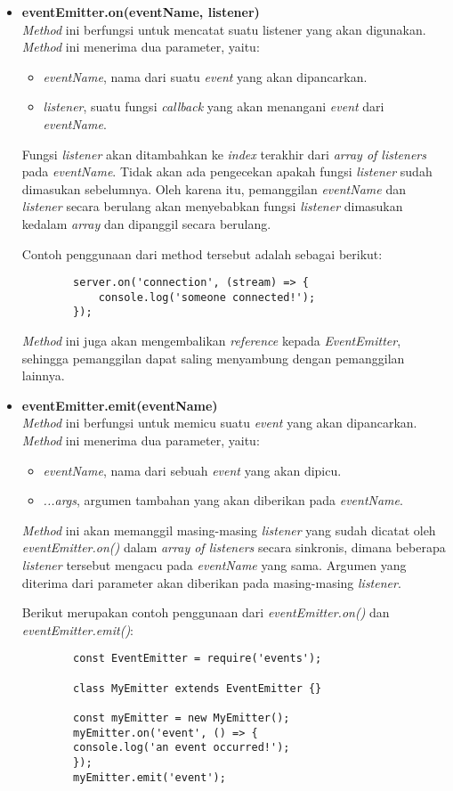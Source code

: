 \begin{itemize}
	\item \textbf{eventEmitter.on(eventName, listener)} \\ \textit{Method} ini berfungsi untuk mencatat suatu listener yang akan digunakan. \textit{Method} ini menerima dua parameter, yaitu:
	\begin{itemize}
		\item \textit{eventName}, nama dari suatu \textit{event} yang akan dipancarkan.
		\item \textit{listener}, suatu fungsi \textit{callback} yang akan menangani \textit{event} dari \textit{eventName}.
	\end{itemize} 
	Fungsi \textit{listener} akan ditambahkan ke \textit{index} terakhir dari \textit{array of listeners} pada \textit{eventName}. Tidak akan ada pengecekan apakah fungsi \textit{listener} sudah dimasukan sebelumnya. Oleh karena itu, pemanggilan \textit{eventName} dan \textit{listener} secara berulang akan menyebabkan fungsi \textit{listener} dimasukan kedalam \textit{array} dan dipanggil secara berulang.
	
	Contoh penggunaan dari method tersebut adalah sebagai berikut:
	\begin{lstlisting}
		server.on('connection', (stream) => {
			console.log('someone connected!');	
		});
	\end{lstlisting}
	
	\textit{Method} ini juga akan mengembalikan \textit{reference} kepada \textit{EventEmitter}, sehingga pemanggilan dapat saling menyambung dengan pemanggilan lainnya.
	
	\item \textbf{eventEmitter.emit(eventName)} \\ \textit{Method} ini berfungsi untuk memicu suatu \textit{event} yang akan dipancarkan. \textit{Method} ini menerima dua parameter, yaitu:
	\begin{itemize}
		\item \textit{eventName}, nama dari sebuah \textit{event} yang akan dipicu.
		\item \textit{...args}, argumen tambahan yang akan diberikan pada \textit{eventName}. 
	\end{itemize}

	\textit{Method} ini akan memanggil masing-masing \textit{listener} yang sudah dicatat oleh \textit{eventEmitter.on()} dalam \textit{array of listeners} secara sinkronis, dimana beberapa \textit{listener} tersebut mengacu pada \textit{eventName} yang sama. Argumen yang diterima dari parameter akan diberikan pada masing-masing \textit{listener}.
	
	Berikut merupakan contoh penggunaan dari \textit{eventEmitter.on()} dan \textit{eventEmitter.emit()}:
	\begin{lstlisting}
		const EventEmitter = require('events');
		
		class MyEmitter extends EventEmitter {}
		
		const myEmitter = new MyEmitter();
		myEmitter.on('event', () => {
		console.log('an event occurred!');
		});
		myEmitter.emit('event');
	\end{lstlisting} 
\end{itemize}

